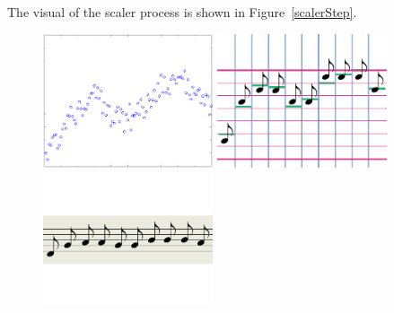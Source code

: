    The visual of the scaler process is shown in Figure~\ref{scalerStep}.

\begin{figure}[htbp]
\centering
\newcommand{\widthOfScalerStepFigure}{5cm}
\includegraphics[width=\widthOfScalerStepFigure]{figWR/scaler0}
\includegraphics[width=\widthOfScalerStepFigure]{figWR/scaler1}
\includegraphics[width=\widthOfScalerStepFigure]{figWR/scaler2}

\end{figure}
